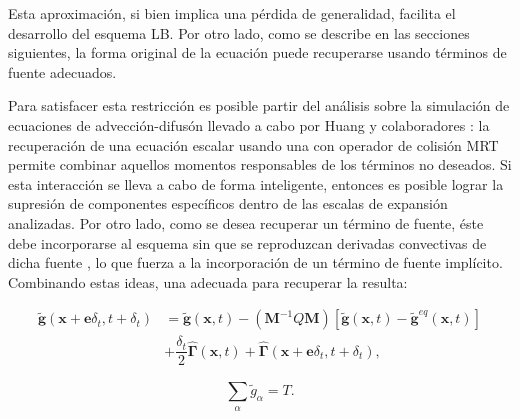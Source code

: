 Esta aproximaci\'on, si bien implica una p\'erdida de generalidad, facilita el desarrollo del esquema LB. Por otro lado, como se describe en las secciones siguientes,  la forma original de la ecuaci\'on puede recuperarse usando t\'erminos de fuente adecuados. 

Para satisfacer esta restricci\'on es posible partir del an\'alisis sobre la simulaci\'on de ecuaciones de advecci\'on-difus\'on llevado a cabo por Huang y colaboradores \cite{huang_modified_2014, huang_numerical_2011, huang_lattice_2015}: la recuperaci\'on de una ecuaci\'on escalar usando una \lbe{} con operador de colisi\'on MRT permite combinar aquellos momentos responsables de los t\'erminos no deseados. Si esta interacci\'on se lleva a cabo de forma inteligente, entonces es posible lograr la supresi\'on de componentes espec\'ificos dentro de las escalas de expansi\'on analizadas. Por otro lado, como se desea recuperar un t\'ermino de fuente, \'este debe incorporarse al esquema sin que se reproduzcan derivadas convectivas de dicha fuente \cite{cheng_introducing_2008}, lo que fuerza a la incorporaci\'on de un t\'ermino de fuente impl\'icito. Combinando estas ideas, una \lbe{} adecuada para recuperar la  resulta:

\begin{equation}
	\begin{aligned}
		\tilde{\bm{g}}(\bm{x} + \bm{e} \delta_t, t+\delta_t) &=
		\tilde{\bm{g}}(\bm{x}, t) - (\bm{M}^{-1}Q\bm{M}) \left[ \tilde{\bm{g}}(\bm{x}, t) - \tilde{\bm{g}}^{eq}(\bm{x}, t) \right] \\
		&  + \dfrac{\delta_t}{2} \hat{\bm{\Gamma}}(\bm{x},t) + \hat{\bm{\Gamma}}(\bm{x} +\bm{e}\delta_t,t + \delta_t),
	\end{aligned}
	\label{eq:g_tilde_2d}	
\end{equation}

\begin{equation}
	\sum_{\alpha} \tilde{g}_{\alpha} = T.
\end{equation}

